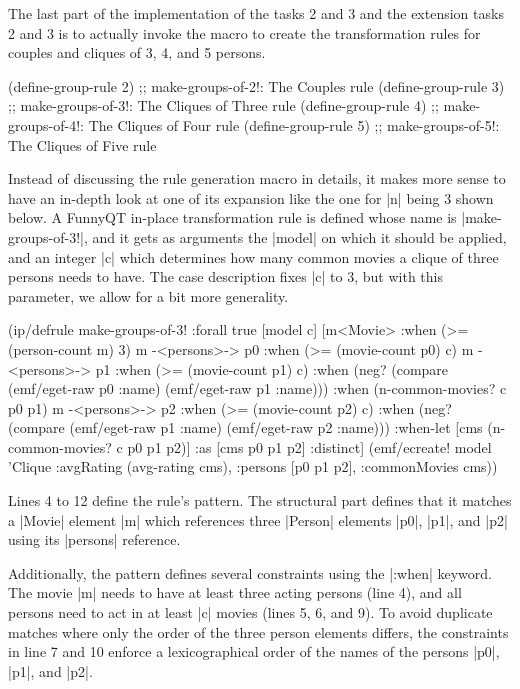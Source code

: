 \documentclass[submission]{eptcs}
\newcommand{\code}{\clojureinline}
\begin{document}
The last part of the implementation of the tasks 2 and 3 and the extension
tasks 2 and 3 is to actually invoke the macro to create the transformation
rules for couples and cliques of 3, 4, and 5 persons.

\begin{clojurecode}
(define-group-rule 2) ;; make-groups-of-2!: The Couples rule
(define-group-rule 3) ;; make-groups-of-3!: The Cliques of Three rule
(define-group-rule 4) ;; make-groups-of-4!: The Cliques of Four rule
(define-group-rule 5) ;; make-groups-of-5!: The Cliques of Five rule
\end{clojurecode}

Instead of discussing the rule generation macro in details, it makes more sense
to have an in-depth look at one of its expansion like the one for \code|n|
being 3 shown below.  A FunnyQT in-place transformation rule is defined whose
name is \code|make-groups-of-3!|, and it gets as arguments the \code|model| on
which it should be applied, and an integer \code|c| which determines how many
common movies a clique of three persons needs to have.  The case description
fixes \code|c| to 3, but with this parameter, we allow for a bit more
generality.

\begin{clojurecode}
(ip/defrule make-groups-of-3!
  {:forall true}
  [model c]
  [m<Movie>           :when (>= (person-count m) 3)
   m -<persons>-> p0  :when (>= (movie-count p0) c)
   m -<persons>-> p1  :when (>= (movie-count p1) c)
                      :when (neg? (compare (emf/eget-raw p0 :name) (emf/eget-raw p1 :name)))
                      :when (n-common-movies? c p0 p1)
   m -<persons>-> p2  :when (>= (movie-count p2) c)
                      :when (neg? (compare (emf/eget-raw p1 :name) (emf/eget-raw p2 :name)))
   :when-let [cms (n-common-movies? c p0 p1 p2)]
   :as [cms p0 p1 p2] :distinct]
  (emf/ecreate! model 'Clique {:avgRating (avg-rating cms), :persons [p0 p1 p2], :commonMovies cms}))
\end{clojurecode}

Lines 4 to 12 define the rule's pattern.  The structural part defines that it
matches a \code|Movie| element \code|m| which references three \code|Person|
elements \code|p0|, \code|p1|, and \code|p2| using its \code|persons|
reference.

Additionally, the pattern defines several constraints using the \code|:when|
keyword.  The movie \code|m| needs to have at least three acting persons (line
4), and all persons need to act in at least \code|c| movies (lines 5, 6, and
9).  To avoid duplicate matches where only the order of the three person
elements differs, the constraints in line 7 and 10 enforce a lexicographical
order of the names of the persons \code|p0|, \code|p1|, and \code|p2|.
\end{document}
